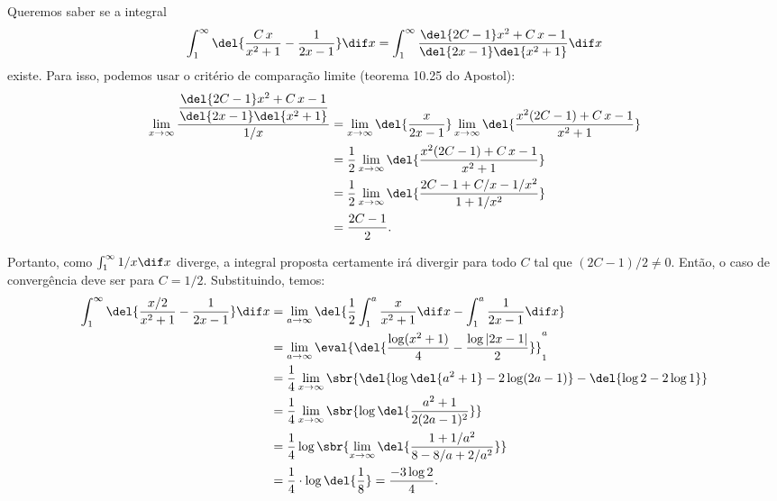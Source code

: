 \documentclass{IMTexam}
\begin{document}
\begin{questions}
        \begin{solution}
            Queremos saber se a integral
            \[ \int_1^\infty\del{\dfrac{C\,x}{x^2+1}-\dfrac{1}{2x-1}}\dif
            x=\int_1^\infty
            \dfrac{\del{2C-1}x^2+C\,x-1}{\del{2x-1}\del{x^2+1}}\dif x \]
            existe. Para isso, podemos usar o critério de comparação limite
            (teorema 10.25 do Apostol):
            \begin{align*}
                \lim\limits_{x\to\infty}
                \dfrac{\dfrac{\del{2C-1}x^2+C\,x-1}{\del{2x-1}
                \del{x^2+1}}}{1/x}&=\lim\limits_{x\to\infty}
                \del{\dfrac{x}{2x-1}}
                \lim\limits_{x\to\infty}\del{\dfrac{x^2(2C-1)+C\,x-1}{x^2+1}}\\
                &=\dfrac{1}{2}\lim\limits_{x\to\infty}\del{\dfrac{x^2(2C-1)+C\,x-1}{x^2+1}}\\
                &=\dfrac{1}{2}\lim\limits_{x\to\infty}\del{\dfrac{2C-1+C/x-1/x^2}{1+1/x^2}}\\
                &=\dfrac{2C-1}{2}.
            \end{align*}

            Portanto, como $\int_1^\infty 1/x \dif x$ diverge, a integral
            proposta certamente irá divergir para todo $C$ tal que
            $(2C-1)/2\neq0$. Então, o caso de convergência deve ser para
            $C=1/2$. Substituindo, temos:
            \begin{align*}
                \int_1^\infty \del{\dfrac{x/2}{x^2+1}-\dfrac{1}{2x-1}}\dif
                x&=\lim\limits_{a\to\infty}\del{\dfrac{1}{2}\int_1^a\dfrac{x}{x^2+1}\dif
                x-\int_1^a \dfrac{1}{2x-1}\dif x}\\
                &= \lim\limits_{a\to\infty} \eval{\del{\dfrac{\log(x^2+1)}{4}-\dfrac{\log|2x-1|}{2}}}_1^a\\
                &= \dfrac{1}{4}\lim\limits_{x\to\infty}\sbr{\del{\log\del{a^2+1}-2\log(2a-1)}-\del{\log 2-2\log 1}}\\                &= \dfrac{1}{4}\lim\limits_{x\to\infty}\sbr{\log\del{\dfrac{a^2+1}{2(2a-1)^2}}}\\
                &= \dfrac{1}{4}\log\sbr{\lim\limits_{x\to\infty}\del{\dfrac{1+1/a^2}{8-8/a+2/a^2}}}\\
                &= \dfrac{1}{4}\cdot\log\del{\dfrac{1}{8}}=\dfrac{-3\log2}{4}.
            \end{align*}
        \end{solution}


\end{questions}
\end{document}
